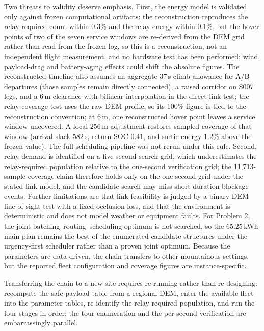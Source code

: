 \documentclass[journal]{IEEEtran}
\begin{document}
Two threats to validity deserve emphasis. First, the energy model is validated
only against frozen computational artifacts: the reconstruction reproduces the
relay-required count within 0.3\% and the relay energy within 0.1\%, but the
hover points of two of the seven service windows are re-derived from the DEM
grid rather than read from the
frozen log, so this is a reconstruction, not an independent flight
measurement, and no hardware test has been performed; wind, payload-drag
and battery-aging effects could shift the absolute figures. The reconstructed
timeline also assumes an aggregate $37$\,s climb allowance for A/B departures
(those samples remain directly connected), a raised corridor on S007 legs, and a
$6$\,m clearance with bilinear interpolation in the direct-link test; the
relay-coverage test uses the raw DEM profile, so its 100\% figure is tied to the
reconstruction convention; at $6$\,m, one reconstructed hover point leaves a
service window uncovered. A local $256$\,m adjustment restores sampled coverage
of that window (arrival slack $582$\,s, return SOC $0.41$, and sortie energy
$1.2\%$ above the frozen value). The full scheduling pipeline was not rerun
under this rule. Second, relay
demand is identified on a five-second search grid, which underestimates the
relay-required population relative to the one-second verification grid; the
11,713-sample coverage claim therefore holds only on the one-second grid under
the stated link model, and the candidate search may miss short-duration
blockage events. Further limitations are that link feasibility is judged by a
binary DEM line-of-sight test with a fixed occlusion loss, and that the
environment is deterministic and does not model weather or equipment faults. For
Problem 2, the joint batching--routing--scheduling optimum is not searched, so
the $65.25$\,kWh main plan remains the best of the enumerated candidate
structures under the urgency-first scheduler rather than a proven joint optimum.
Because the parameters are data-driven, the chain transfers to other mountainous
settings, but the reported fleet configuration and coverage figures are
instance-specific.

Transferring the chain to a new site requires re-running rather than
re-designing: recompute the safe-payload table from a regional DEM, enter the
available fleet into the parameter tables, re-identify the relay-required
population, and run the four stages in order; the tour enumeration and the
per-second verification are embarrassingly parallel.

\end{document}
